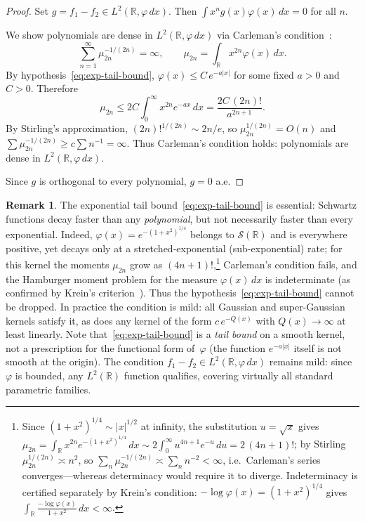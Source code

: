 \documentclass[12pt]{article}
\theoremstyle{definition}
\newtheorem{remark}[theorem]{Remark}
\newcommand{\R}{\mathbb{R}}
\begin{document}
\begin{proof}
Set $g = f_1 - f_2 \in L^2(\R,\varphi\,dx)$.  Then $\int x^n g(x)\varphi(x)\,dx = 0$ for all $n$.

We show polynomials are dense in $L^2(\R, \varphi\,dx)$ via Carleman's condition~\cite{Shohat1943}:
\begin{equation}\label{eq:carleman}
  \sum_{n=1}^{\infty} \mu_{2n}^{-1/(2n)} = \infty,
  \qquad
  \mu_{2n} = \int_{\R} x^{2n}\varphi(x)\,dx.
\end{equation}
By hypothesis~\eqref{eq:exp-tail-bound}, $\varphi(x) \leq C\,e^{-a|x|}$ for some fixed $a > 0$ and $C > 0$.  Therefore
\[
  \mu_{2n} \leq 2C \int_0^\infty x^{2n} e^{-ax}\,dx = \frac{2C\,(2n)!}{a^{2n+1}}.
\]
By Stirling's approximation, $(2n)!^{1/(2n)} \sim 2n/e$, so $\mu_{2n}^{1/(2n)} = O(n)$ and $\sum \mu_{2n}^{-1/(2n)} \ge c\sum n^{-1} = \infty$.  Thus Carleman's condition holds: polynomials are dense in $L^2(\R,\varphi\,dx)$.

Since $g$ is orthogonal to every polynomial, $g = 0$ a.e.
\end{proof}

\begin{remark}\label{rem:carleman-automatic}
The exponential tail bound~\eqref{eq:exp-tail-bound} is essential: Schwartz functions decay faster than any \emph{polynomial}, but not necessarily faster than every exponential.  Indeed, $\varphi(x) = e^{-(1+x^2)^{1/4}}$ belongs to $\mathcal{S}(\R)$ and is everywhere positive, yet decays only at a stretched-exponential (sub-exponential) rate; for this kernel the moments $\mu_{2n}$ grow as $(4n+1)!$,\footnote{Since $(1+x^2)^{1/4}\sim|x|^{1/2}$ at infinity, the substitution $u=\sqrt{x}$ gives $\mu_{2n}=\int_\R x^{2n}e^{-(1+x^2)^{1/4}}\,dx\sim 2\int_0^\infty u^{4n+1}e^{-u}\,du=2\,(4n+1)!$; by Stirling $\mu_{2n}^{1/(2n)}\asymp n^{2}$, so $\sum_n\mu_{2n}^{-1/(2n)}\asymp\sum_n n^{-2}<\infty$, i.e.\ Carleman's series converges---whereas determinacy would require it to diverge.  Indeterminacy is certified separately by Krein's condition: $-\log\varphi(x)=(1+x^2)^{1/4}$ gives $\int_\R\frac{-\log\varphi(x)}{1+x^2}\,dx<\infty$.} Carleman's condition fails, and the Hamburger moment problem for the measure $\varphi(x)\,dx$ is indeterminate (as confirmed by Krein's criterion~\cite{Stoyanov2000Krein}).  Thus the hypothesis~\eqref{eq:exp-tail-bound} cannot be dropped.  In practice the condition is mild: all Gaussian and super-Gaussian kernels satisfy it, as does any kernel of the form $c\,e^{-Q(x)}$ with $Q(x)\to\infty$ at least linearly.  Note that~\eqref{eq:exp-tail-bound} is a \emph{tail bound} on a smooth kernel, not a prescription for the functional form of~$\varphi$ (the function $e^{-a|x|}$ itself is not smooth at the origin).  The condition $f_1 - f_2 \in L^2(\R,\varphi\,dx)$ remains mild: since $\varphi$ is bounded, any $L^2(\R)$ function qualifies, covering virtually all standard parametric families.
\end{remark}
\end{document}
